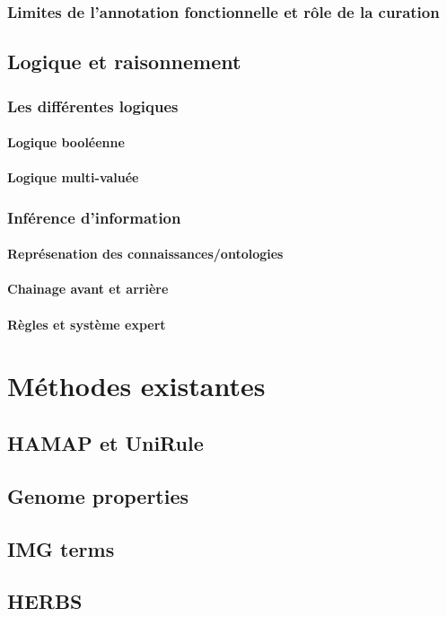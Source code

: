 \begin{refsection}
    \subsubsection{Limites de l’annotation fonctionnelle et rôle de la curation}
    \subsection{Logique et raisonnement}
    \subsubsection{Les différentes logiques}
    \paragraph{Logique booléenne}
    \paragraph{Logique multi-valuée}
    \subsubsection{Inférence d’information}
    \paragraph{Représenation des connaissances/ontologies}
    \paragraph{Chainage avant et arrière} %
    \paragraph{Règles et système expert}
    
    \section{Méthodes existantes}
    \subsection{HAMAP et UniRule}
    \subsection{Genome properties}
    \subsection{IMG terms}
    \subsection{HERBS}
    
    \subbibliography
\end{refsection}
